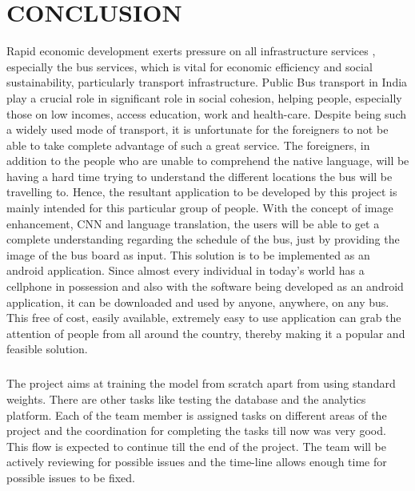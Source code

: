 \documentclass[a4paper,12pt]{report}
\begin{document}
\chapter{CONCLUSION}
Rapid economic development exerts pressure on all infrastructure services , especially the bus services, which is vital for economic efficiency and social sustainability, particularly transport infrastructure. Public Bus transport in India  play a crucial role in significant role in social cohesion, helping people, especially those on low incomes, access education, work and health-care. Despite being such a widely used mode of transport, it is unfortunate for the foreigners to not be able to take complete advantage of such a great service. The foreigners, in addition to the people who are unable to comprehend the native language, will be having a hard time trying to understand the different locations the bus will be travelling to. Hence, the resultant application to be developed by this project is mainly intended for this particular group of people. With the concept of image enhancement, CNN and language translation, the users will be able to get a complete understanding regarding the schedule of the bus, just by providing the image of the bus board as input. This solution is to be implemented as an android application. Since almost every individual in today’s world has a cellphone in possession and also with the software being developed as an android application, it can be downloaded and used by anyone, anywhere, on any bus. This free of cost, easily available, extremely easy to use application can grab the attention of people from all around the country, thereby making it a popular and feasible solution. 

\paragraph{}
The project aims at training the model from scratch apart from using standard weights. There are other tasks like testing the database and the analytics platform. Each of the team member is assigned tasks on different areas of the project and the coordination for completing the tasks till now was very good. This flow is expected to continue till the end of the project. The team will be actively reviewing for possible issues and the time-line allows enough time for possible issues to be fixed.

\newpage
{}
\renewcommand\bibname{\textbf{REFERENCES}}

\end{document}
